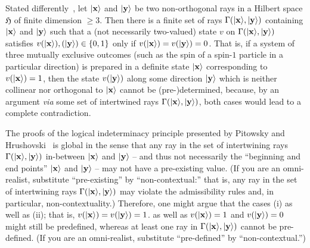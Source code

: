 Stated differently~\cite[Theorem~2,p~183]{hru-pit-2003},
let $\vert {\bf x} \rangle$
and
$\vert {\bf y} \rangle$
be two non-orthogonal rays in a Hilbert space $\mathfrak{H}$ of finite
dimension $\ge 3$. Then there is a finite set of rays $\Gamma ( \vert {\bf x} \rangle , \vert {\bf y} \rangle )$ containing
$\vert {\bf x} \rangle$
and
$\vert {\bf y} \rangle$
such that a (not necessarily two-valued)
state $v$ on $\Gamma ( \vert {\bf x} \rangle , \vert {\bf y} \rangle )$
satisfies $v ( \vert {\bf x} \rangle ),( \vert {\bf y} \rangle ) \in \{0,1\}$
only if $v ( \vert {\bf x} \rangle ) = v ( \vert {\bf y} \rangle ) =0$.
That is,
if a system of three mutually exclusive outcomes (such as the spin of a spin-$1$ particle in a particular direction)
is prepared in a definite state $\vert {\bf x} \rangle$  corresponding to $v(\vert {\bf x} \rangle )=1$,
then the state $ v ( \vert {\bf y} \rangle ) $ along  some direction $\vert {\bf y} \rangle $ which is neither collinear nor orthogonal
to  $\vert {\bf x} \rangle$
cannot be (pre-)determined,
because, by an argument {\it via} some set of intertwined rays  $\Gamma ( \vert {\bf x} \rangle , \vert {\bf y} \rangle )$,
both cases would lead to a complete contradiction.

The proofs of the logical indeterminacy principle
presented by  Pitowsky and Hrushovski~\cite{pitowsky:218,hru-pit-2003}
is global in the sense that any ray in the
set of intertwining rays $\Gamma ( \vert {\bf x} \rangle , \vert {\bf y} \rangle )$
in-between  $\vert {\bf x} \rangle$
and
$\vert {\bf y} \rangle$  -- and thus not necessarily the ``beginning and end points''
$\vert {\bf x} \rangle$
and
$\vert {\bf y} \rangle$
--
may not have a pre-existing value.
(If you are an omni-realist, substitute ``pre-existing'' by ``non-contextual:''
that is, any ray in the
set of intertwining rays $\Gamma ( \vert {\bf x} \rangle , \vert {\bf y} \rangle )$
may violate the admissibility rules and, in particular, non-contextuality.)
Therefore, one might argue that the cases
(i) as well as (ii); that is,
$v ( \vert {\bf x} \rangle ) = v ( \vert {\bf y} \rangle ) =1$.
as well as
$v ( \vert {\bf x} \rangle ) = 1$ and $ v ( \vert {\bf y} \rangle ) =0$
might still be predefined, whereas at least one ray in $\Gamma ( \vert {\bf x} \rangle , \vert {\bf y} \rangle )$ cannot be pre-defined.
(If you are an omni-realist, substitute ``pre-defined'' by ``non-contextual.'')


